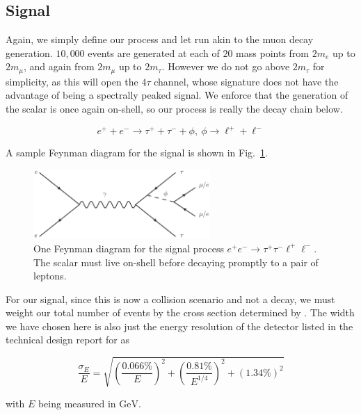 \subsection{Signal}
Again, we simply define our process and let \madgraph run akin to the muon decay generation.
$10,000$ events are generated at each of $20$ mass points from $2m_e$ up to $2m_\mu$, and again from $2m_\mu$ up to $2m_\tau$.
However we do not go above $2m_\tau$ for simplicity, as this will open the $4\tau$ channel, whose signature does not have the advantage of being a spectrally peaked signal. 
We enforce that the generation of the scalar is once again on-shell, so our process is really the decay chain below.

\begin{equation}
    e^+ + e^- \rightarrow \tau^+ + \tau^- + \phi,~\phi \rightarrow \ell^+ + \ell^-
\end{equation}

A sample Feynman diagram for the signal is shown in Fig.\ \ref{fig:ee_tautaull_scalar}.

\begin{figure}[h]
    \centering
    \includegraphics[width=0.6\textwidth]{Figures/feynman_diagrams/ee_tautaull_scalar}
    \caption{One Feynman diagram for the signal process $e^+ e^- \rightarrow \tau^+ \tau^- \ell^+ \ell^-$. The scalar must live on-shell before decaying promptly to a pair of leptons.}
    \label{fig:ee_tautaull_scalar}
\end{figure}

For our signal, since this is now a collision scenario and not a decay, we must weight our total number of events by the cross section determined by \madgraph.
The width we have chosen here is also just the energy resolution of the detector listed in the technical design report for \belletwo \cite{Abe:2010gxa} as

\begin{equation}
    \frac{\sigma_E}{E} = \sqrt{\left(\frac{0.066\%}{E}\right)^2 + \left(\frac{0.81\%}{E^{1/4}}\right)^2 + \left(1.34\%\right)^2}
\end{equation}

\noindent with $E$ being measured in $\textrm{GeV}$.

